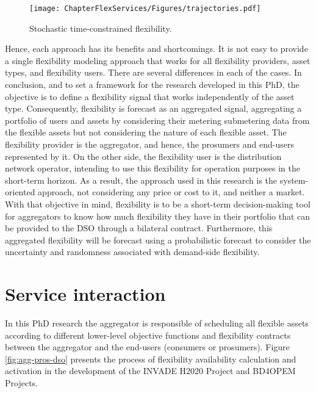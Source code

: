 \begin{figure}[htbp]
	\centering
	\texttt{[image: ChapterFlexServices/Figures/trajectories.pdf]}
		\caption{Stochastic time-constrained flexibility.}
	\label{fig:system}  
\end{figure}

Hence, each approach has its benefits and shortcomings. It is not easy to provide a single flexibility modeling approach that works for all flexibility providers, asset types, and flexibility users. There are several differences in each of the cases. In conclusion, and to set a framework for the research developed in this PhD, the objective is to define a flexibility signal that works independently of the asset type. Consequently, flexibility is forecast as an aggregated signal, aggregating a portfolio of users and assets by considering their metering submetering data from the flexible assets but not considering the nature of each flexible asset. 
The flexibility provider is the aggregator, and hence, the prosumers and end-users represented by it. On the other side, the flexibility user is the distribution network operator, intending to use this flexibility for operation purposes in the short-term horizon. As a result, the approach used in this research is the system-oriented approach, not considering any price or cost to it, and neither a market. With that objective in mind, flexibility is to be a short-term decision-making tool for aggregators to know how much flexibility they have in their portfolio that can be provided to the DSO through a bilateral contract. Furthermore, this aggregated flexibility will be forecast using a probabilistic forecast to consider the uncertainty and randomness associated with demand-side flexibility. 

\section{Service interaction}

In this PhD research the aggregator is responsible of scheduling all flexible assets according to different lower-level objective functions and flexibility contracts between the aggregator and the end-users (consumers or prosumers). Figure \ref{fig:agg-pros-dso} presents the process of flexibility availability calculation and activation in the development of the INVADE H2020 Project and BD4OPEM Projects. 

